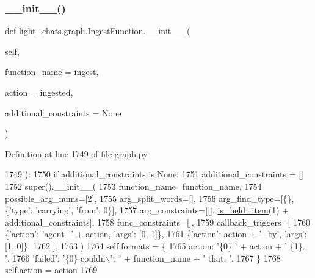 \subsubsection{\texorpdfstring{\+\_\+\+\_\+init\+\_\+\+\_\+()}{\_\_init\_\_()}}
{\footnotesize\ttfamily def light\+\_\+chats.\+graph.\+Ingest\+Function.\+\_\+\+\_\+init\+\_\+\+\_\+ (\begin{DoxyParamCaption}\item[{}]{self,  }\item[{}]{function\+\_\+name = {\ttfamily \textquotesingle{}ingest\textquotesingle{}},  }\item[{}]{action = {\ttfamily \textquotesingle{}ingested\textquotesingle{}},  }\item[{}]{additional\+\_\+constraints = {\ttfamily None} }\end{DoxyParamCaption})}



Definition at line 1749 of file graph.\+py.


\begin{DoxyCode}
1749     ):
1750         \textcolor{keywordflow}{if} additional\_constraints \textcolor{keywordflow}{is} \textcolor{keywordtype}{None}:
1751             additional\_constraints = []
1752         super().\_\_init\_\_(
1753             function\_name=function\_name,
1754             possible\_arg\_nums=[2],
1755             arg\_split\_words=[],
1756             arg\_find\_type=[\{\}, \{\textcolor{stringliteral}{'type'}: \textcolor{stringliteral}{'carrying'}, \textcolor{stringliteral}{'from'}: 0\}],
1757             arg\_constraints=[[], \hyperlink{namespacelight__chats_1_1graph_aa0be6ee7e9f549a7195bea9dfb962ad6}{is\_held\_item}(1) + additional\_constraints],
1758             func\_constraints=[],
1759             callback\_triggers=[
1760                 \{\textcolor{stringliteral}{'action'}: \textcolor{stringliteral}{'agent\_'} + action, \textcolor{stringliteral}{'args'}: [0, 1]\},
1761                 \{\textcolor{stringliteral}{'action'}: action + \textcolor{stringliteral}{'\_by'}, \textcolor{stringliteral}{'args'}: [1, 0]\},
1762             ],
1763         )
1764         self.formats = \{
1765             action: \textcolor{stringliteral}{'\{0\} '} + action + \textcolor{stringliteral}{' \{1\}. '},
1766             \textcolor{stringliteral}{'failed'}: \textcolor{stringliteral}{'\{0\} couldn\(\backslash\)'t '} + function\_name + \textcolor{stringliteral}{' that. '},
1767         \}
1768         self.action = action
1769 
\end{DoxyCode}


